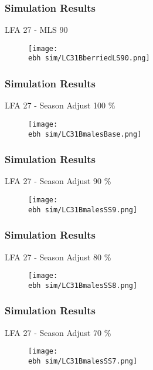 \documentclass{beamer}
\newcommand{\ebh}{\string~/bio.data/bio.lobster/figures/LFA2733Framework2018/} %
\begin{document}
\begin{frame}
\frametitle{Simulation Results}
LFA 27 - MLS 90
\begin{figure}
        \begin{center}
            \texttt{[image: \\ebh sim/LC31BberriedLS90.png]}
        \end{center}
    \end{figure}
\end{frame}




\begin{frame}
\frametitle{Simulation Results}
LFA 27 - Season Adjust 100 \%
\begin{figure}
        \begin{center}
            \texttt{[image: \\ebh sim/LC31BmalesBase.png]}
        \end{center}
    \end{figure}
\end{frame}


\begin{frame}
\frametitle{Simulation Results}
LFA 27 - Season Adjust 90 \%
\begin{figure}
        \begin{center}
            \texttt{[image: \\ebh sim/LC31BmalesSS9.png]}
        \end{center}
    \end{figure}
\end{frame}


\begin{frame}
\frametitle{Simulation Results}
LFA 27 - Season Adjust 80 \%
\begin{figure}
        \begin{center}
            \texttt{[image: \\ebh sim/LC31BmalesSS8.png]}
        \end{center}
    \end{figure}
\end{frame}


\begin{frame}
\frametitle{Simulation Results}
LFA 27 - Season Adjust 70 \%
\begin{figure}
        \begin{center}
            \texttt{[image: \\ebh sim/LC31BmalesSS7.png]}
        \end{center}
    \end{figure}
\end{frame}
\end{document}
